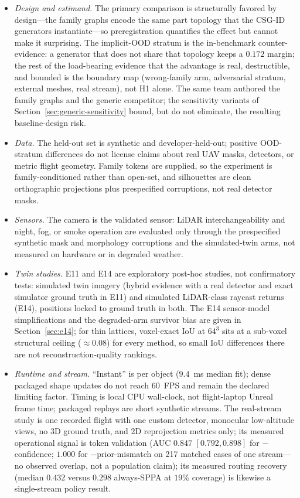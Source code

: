 \documentclass[11pt,a4paper]{article}
\begin{document}
\begin{itemize}
\item \emph{Design and estimand.} The primary comparison is structurally
favored by design---the family graphs encode the same part topology that the
CSG-ID generators instantiate---so preregistration quantifies the effect but
cannot make it surprising. The implicit-OOD stratum is the in-benchmark
counter-evidence: a generator that does not share that topology keeps a
\(0.172\) margin; the rest of the load-bearing evidence that the advantage
is real, destructible, and bounded is the boundary map (wrong-family arm,
adversarial stratum, external meshes, real stream), not H1 alone. The same
team authored the family graphs and the generic competitor; the sensitivity
variants of Section~\ref{sec:generic-sensitivity} bound, but do not
eliminate, the resulting baseline-design risk.
\item \emph{Data.} The held-out set is synthetic and developer-held-out;
positive OOD-stratum differences do not license claims about real UAV masks,
detectors, or metric flight geometry. Family tokens are supplied, so the
experiment is family-conditioned rather than open-set, and silhouettes are
clean orthographic projections plus prespecified corruptions, not real
detector masks.
\item \emph{Sensors.} The camera is the validated sensor: LiDAR
interchangeability and night, fog, or smoke operation are evaluated only
through the prespecified synthetic mask and morphology corruptions and the
simulated-twin arms, not measured on hardware or in degraded weather.
\item \emph{Twin studies.} E11 and E14 are exploratory post-hoc studies,
not confirmatory tests: simulated twin imagery (hybrid evidence with a real
detector and exact simulator ground truth in E11) and simulated LiDAR-class
raycast returns (E14), positions locked to ground truth in both. The E14
sensor-model simplifications and the degraded-arm survivor bias are given
in Section~\ref{sec:e14}; for thin lattices, voxel-exact IoU at \(64^3\)
sits at a sub-voxel structural ceiling (\(\approx\)\(0.08\)) for every
method, so small IoU differences there are not reconstruction-quality
rankings.
\item \emph{Runtime and stream.} ``Instant'' is per object (\(9.4\)~ms
median fit); dense packaged shape updates do not reach 60~FPS and remain the
declared limiting factor. Timing is local CPU wall-clock, not flight-laptop
Unreal frame time; packaged replays are short synthetic streams. The
real-stream study is one recorded flight with one custom detector, monocular
low-altitude views, no 3D ground truth, and 2D reprojection metrics only;
its measured operational signal is token validation (AUC \(0.847\)
\([0.792,0.898]\) for \(-\)confidence; \(1.000\) for \(-\)prior-mismatch on
217 matched cases of one stream---no observed overlap, not a population
claim); its measured routing recovery (median \(0.432\) versus \(0.298\)
always-SPPA at \(19\%\) coverage) is likewise a single-stream policy
result.
\end{itemize}
\end{document}
